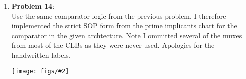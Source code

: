 \documentclass{article}
\newcommand{\fig}[2]{
    \begin{center}
        \texttt{[image: figs/\#2]}
    \end{center}
}
\begin{document}
\begin{enumerate}
        \item \textbf{Problem 14}: \\
            Use the same comparator logic from the previous problem. I
            therefore implemented the strict SOP form from the prime implicants
            chart for the comparator in the given archtecture. Note I ommitted
            several of the muxes from most of the CLBs as they were never used.
            Apologies for the handwritten labels.
            \fig{.65}{p14.jpg}

    \end{enumerate}

    \pagebreak

    \begin{scriptsize}

        
        \pagebreak
        
        \pagebreak
        \begin{landscape}
                
        \end{landscape}
    \end{scriptsize}
\end{document}
